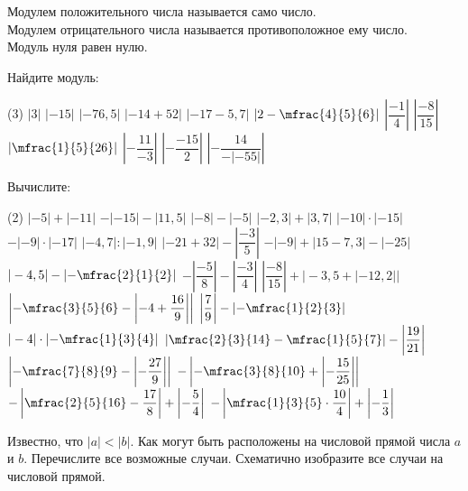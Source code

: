 \begin{class}[number=5-6]
	\begin{definit}
		Модулем положительного числа называется само число. \\
		Модулем отрицательного числа называется противоположное ему число. \\
		Модуль нуля равен нулю.
	\end{definit}
	\begin{listofex}
		\item Найдите модуль:
		\begin{tasks}(3)
			\task \(  |3| \)
			\task \(  |-15| \)
			\task \( |-76,5|  \)
			\task \( |-14+52|  \)
			\task \( |-17-5,7|  \)
			\task \(  \left|2-\mfrac{4}{5}{6}\right| \)
			\task \(  \left|\dfrac{-1}{4}\right| \)
			\task \(  \left|\dfrac{-8}{15}\right| \)
			\task \(  \left|\mfrac{1}{5}{26}\right| \)
			\task \(  \left|-\dfrac{11}{-3}\right| \)
			\task \(  \left|-\dfrac{-15}{2}\right| \)
			\task \(  \left|-\dfrac{14}{-|-55|}\right| \)
		\end{tasks}
		\item Вычислите:
		\begin{tasks}(2)
			\task \(  |-5|+|-11| \)
			\task \(  -|-15|-|11,5| \)
			\task \( |-8|-|-5| \)
			\task \( |-2,3|+|3,7|  \)
			\task \(  |-10|\cdot|-15| \)
			\task \(  -|-9|\cdot|-17| \)
			\task \( |-4,7|:|-1,9| \)
			\task \( |-21+32| - \left|\dfrac{-3}{5}\right|  \)
			\task \( -|-9|+|15-7,3|-|-25|  \)
			\task \(  |-4,5|-\left|-\mfrac{2}{1}{2}\right| \)
			\task \(  -\left| \dfrac{-5}{8} \right|-\left|\dfrac{-3}{4}\right| \)
			\task \(  \left|\dfrac{-8}{15}\right| + \bigl|-3,5+|-12,2|| \)
			\task \(  \left|-\mfrac{3}{5}{6} - \left|-4+\dfrac{16}{9}\right|\right| \)
			\task \( \left|\dfrac{7}{9}\right|-\left|-\mfrac{1}{2}{3}\right| \)
			\task \( |-4|\cdot\left|-\mfrac{1}{3}{4}\right| \)
			\task \( \left|\mfrac{2}{3}{14}-\mfrac{1}{5}{7}\right|-\left|\dfrac{19}{21}\right| \)
			\task \(  \left|-\mfrac{7}{8}{9} - \left|-\dfrac{27}{9}\right|\right| \)
			\task \( -\left|-\mfrac{3}{8}{10} + \left|-\dfrac{15}{25}\right|\right| \)
			\task \( -\left|\mfrac{2}{5}{16}-\dfrac{17}{8}\right|+\left|-\dfrac{5}{4}\right| \)
			\task \( -\left|\mfrac{1}{3}{5} \cdot \dfrac{10}{4}\right|+\left|-\dfrac{1}{3}\right| \)
		\end{tasks}
		\item Известно, что \( |a|<|b| \). Как могут быть расположены на числовой прямой числа \( a \) и \( b \). Перечислите все возможные случаи. Схематично изобразите все случаи на числовой прямой.

\end{listofex}
\end{class}
